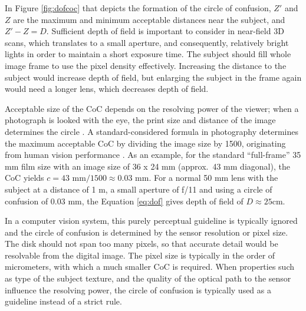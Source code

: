 In Figure \ref{fig:dofcoc} that depicts the formation of the circle of confusion, $Z'$ and $Z$ are the maximum and minimum acceptable distances near the subject, and $Z' - Z = D$.
Sufficient depth of field is important to consider in near-field 3D scans, which translates to a small aperture, and consequently, relatively bright lights in order to maintain a short exposure time.
The subject should fill whole image frame to use the pixel density effectively.
Increasing the distance to the subject would increase depth of field, but enlarging the subject in the frame again would need a longer lens, which decreases depth of field.

Acceptable size of the CoC depends on the resolving power of the viewer; when a photograph is looked with the eye, the print size and distance of the image determines the circle \cite{greenleaf1950photographic}.
A standard-considered formula in photography determines the maximum acceptable CoC by dividing the image size by 1500, originating from human vision performance \cite[p. 88, 92]{kingslake1992optics}.
As an example, for the standard ``full-frame'' 35 mm film size with an image size of 36 x 24 mm (approx.\ 43 mm diagonal), the CoC yields $c = 43 \text{ mm} / 1500 \approx 0.03 \text{ mm}$.
For a normal 50 mm lens with the subject at a distance of 1 m, a small aperture of f/11 and using a circle of confusion of 0.03 mm, the Equation \ref{eq:dof} gives depth of field of $D \approx 25 \text{cm}$. 

In a computer vision system, this purely perceptual guideline is typically ignored and the circle of confusion is determined by the sensor resolution or pixel size.
The disk should not span too many pixels, so that accurate detail would be resolvable from the digital image.
The pixel size is typically in the order of micrometers, with which a much smaller CoC is required.
When properties such as type of the subject texture, and the quality of the optical path to the sensor influence the resolving power, the circle of confusion is typically used as a guideline instead of a strict rule.


